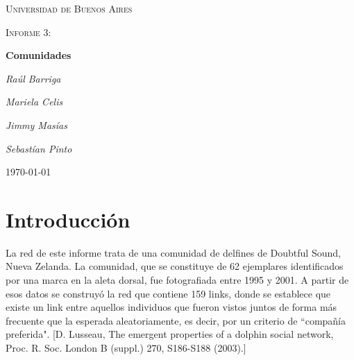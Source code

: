 \documentclass[11pt, spanish]{article}
\begin{document}
\begin{titlepage}
    \centering
    {\scshape\LARGE Universidad de Buenos Aires \par}
    \vspace{1cm}
    {\scshape\Large Informe 3:\par}

    \vspace{1.5cm}
    {\scshape\Large\par}
    {\huge\bfseries  Comunidades\par}
    \vspace{2cm}
    {\Large\itshape Ra\'ul Barriga\par}
    {\Large\itshape Mariela Celis\par}
    {\Large\itshape Jimmy Mas\'ias\par}
    {\Large\itshape Sebast\'ian Pinto\par}

    \vfill

    \vfill

    {\large \today\par}
\end{titlepage}

    \tableofcontents

    \section{Introducción}
    \par La red de este informe trata de una comunidad de delfines de Doubtful Sound, Nueva Zelanda. La comunidad, que se constituye de 62 ejemplares identificados por una marca en la aleta dorsal, fue fotografiada entre 1995 y 2001. A partir de esos datos se construyó la red que contiene 159 links, donde se establece que existe un link entre aquellos individuos que fueron vistos juntos de forma más frecuente que la esperada aleatoriamente, es decir, por un criterio de ``compañía preferida". [D. Lusseau, The emergent properties of a dolphin social network, Proc. R. Soc. London B (suppl.) 270, S186-S188 (2003).]

    
    
    
    

%
%
\end{document}

